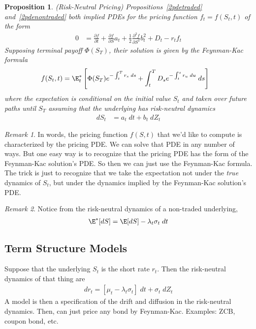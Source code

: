 \documentclass[12pt]{article}
\theoremstyle{plain}
\newtheorem{prop}[thm]{Proposition}
\theoremstyle{definition}
\theoremstyle{remark}
\newtheorem*{rmk}{Remark}
\begin{document}
\begin{prop}\emph{(Risk-Neutral Pricing)}
Propositions~\ref{2pdetraded} and~\ref{2pdenontraded} both implied
PDEs for the pricing function $f_t=f(S_t,t)$ of the form
\begin{align*}
  0
  &=
  \frac{\partial f}{\partial t}
  +
  \frac{\partial f}{\partial S}
  a_t
  +
  \frac{1}{2}
  \frac{\partial^2 f}{\partial S^2}
  b_t^2
  +
  D_t
  -
  r_t
  f_t
\end{align*}
Supposing terminal payoff $\Phi(S_T)$, their solution is given by the
Feynman-Kac formula
\begin{align*}
  f(S_t,t)
  &=
  \E^*_t\left[
    \Phi(S_T)
    e^{-\int_t^T r_s\;ds}
    +
    \int_t^T
    D_s
    e^{-\int_t^s r_u\;du}
    \;ds
  \right]
\end{align*}
where the expectation is conditional on the initial value $S_t$ and
taken over future paths until $S_T$ assuming that the underlying has
\emph{risk-neutral dynamics}
\begin{align*}
  dS_t
  &= a_t\;dt + b_t\;dZ_t
\end{align*}
\end{prop}
\begin{rmk}
In words, the pricing function $f(S,t)$ that we'd like to compute is
characterized by the pricing PDE.
We can solve that PDE in any number of ways.
But one easy way is to recognize that the pricing PDE has the form of
the Feynman-Kac solution's PDE.
So then we can just use the Feynman-Kac formula.
The trick is just to recognize that we take the expectation not under
the \emph{true} dynamics of $S_t$, but under the dynamics implied by the
Feynman-Kac solution's PDE.
\end{rmk}
\begin{rmk}
Notice from the risk-neutral dynamics of a non-traded underlying,
\begin{align*}
  \E^*[dS]
  =
  \E[dS] - \lambda_t \sigma_t\;dt
\end{align*}

\end{rmk}



\clearpage
\subsection{Term Structure Models}

Suppose that the underlying $S_t$ is the short rate $r_t$.
Then the risk-neutral dynamics of that thing are
\begin{align*}
  dr_t
  =
  [\mu_t-\lambda_t\sigma_t]\;dt
  + \sigma_t \;dZ_t
\end{align*}
A model is then a specification of the drift and diffusion in the
risk-neutral dynamics. Then, can just price any bond by Feynman-Kac.
Examples: ZCB, coupon bond, etc.
\end{document}
